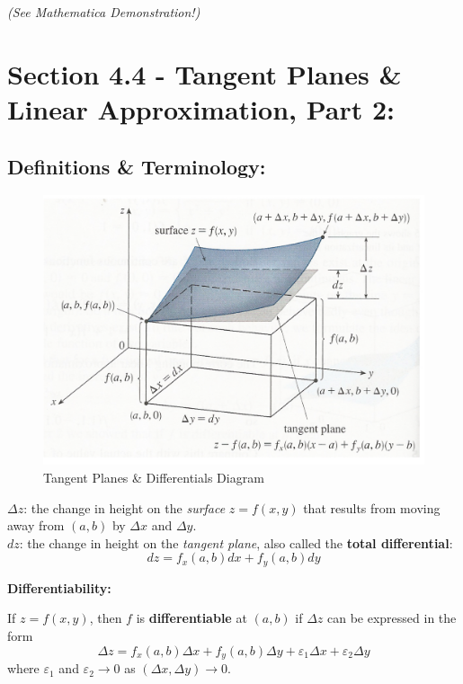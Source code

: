 \vfill \hfill \textit{(See Mathematica Demonstration!)}

\pagebreak



\section*{Section 4.4 - Tangent Planes \& Linear Approximation, Part 2:}


\subsection*{Definitions \& Terminology:}

\begin{figure}[!h]

\includegraphics[width=.5\textwidth]{Tangent-Plane-Textbook.png}
\caption{Tangent Planes \& Differentials Diagram}
\end{figure}

\(\Delta z\): the change in height on the \textit{surface} \(z=f(x,y)\) that results from moving away from \((a,b)\) by \(\Delta x\) and \(\Delta y\).\\

\(dz\): the change in height on the \textit{tangent plane}, also called the \textbf{total differential}:
\[dz = f_x(a,b) dx + f_y(a,b) dy\]

\textbf{Differentiability:}

If \(z=f(x,y)\), then \(f\) is \textbf{differentiable} at \((a,b)\) if \(\Delta z\) can be expressed in the form
\[\Delta z = f_x(a,b) \Delta x + f_y(a,b)\Delta y + \varepsilon_1 \Delta x + \varepsilon_2 \Delta y\]
where \(\varepsilon_1\) and \(\varepsilon_2 \rightarrow 0\) as \((\Delta x, \Delta y)\rightarrow0\).\\

